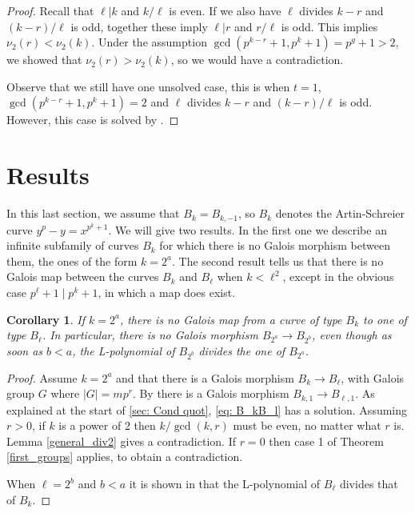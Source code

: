 \documentclass[oneside,a4paper,12pt]{article}
\theoremstyle{plain} %
\newtheorem{corollary}[theorem]{Corollary}
\theoremstyle{definition} %
\begin{document}
\begin{proof}
Recall that  $\ell |k$ and $k/\ell $ is even.
If we also have $\ell$ divides $k-r$ and 
$(k-r)/\ell$ is odd,
together these imply $\ell |r$ and $r/\ell$ is odd.
This implies $\nu_2(r)< \nu_2(k)$.
Under the assumption $\gcd(p^{k-r}+1,p^k+1)=p^g+1>2$,
we showed that $\nu_2(r)>\nu_2(k)$,
so we would have a contradiction.


Observe that we still have one unsolved case, this is when $t=1$, $\gcd(p^{k-r}+1, p^k+1)=2$ and $\ell$ divides $k-r$ and $(k-r)/\ell$ is odd. However, this case is solved by .
\end{proof}





\section{Results} \label{sec:inf family}



In this last section, 
we assume that $B_k=B_{k,-1}$, so $B_k$ denotes the 
Artin-Schreier curve $y^p-y=x^{p^k+1}$.
We will give two results. In the first one we describe an infinite subfamily of curves $B_k$ for which there is no Galois morphism between them, the ones of the form $k=2^a$. The second result tells us that there is no Galois map between the curves $B_k$ and $B_\ell$ when $k<\ell^2$, except in the obvious case $p^\ell+1\mid p^k+1$, in which a map does exist.



\begin{corollary}\label{result1}
If $k=2^a$, there is no Galois map from a curve of type $B_k$ to one of type $B_{\ell}$. 
In particular, there is no Galois morphism  $B_{2^a}\longrightarrow B_{2^b}$, even though as soon as $b<a$, the L-polynomial of $B_{2^b}$ divides the one of $B_{2^a}$.
\end{corollary}

\begin{proof} 
Assume $k=2^a$ and that there is a Galois morphism 
$B_{k}\longrightarrow B_\ell$, with Galois group $G$ where
$|G|=mp^r$. 
By   there is a Galois morphism 
$B_{k,1}\longrightarrow B_{\ell,1}$.
As explained at the start of \cref{sec: Cond quot},
\eqref{eq: B_kB_l} has a solution.
Assuming $r>0$, if $k$ is a power of 2 then $k/\gcd(k,r)$ must be even, 
no matter what $r$ is.
Lemma \ref{general_div2}  gives a contradiction.
If $r=0$ then case 1 of Theorem \ref{first_groups} applies, 
to obtain a contradiction.

When $\ell =2^b$ and $b<a$ it is shown in \cite{MCGUIRE20193341}
that the L-polynomial of $B_\ell$ divides that of $B_k$.
\end{proof}
\end{document}
